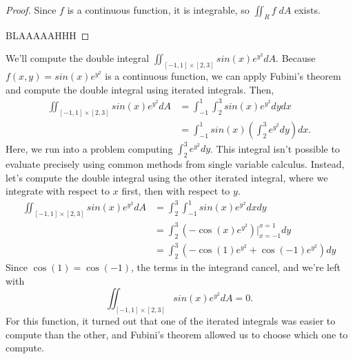 \documentclass{ximera}
\begin{document}
\begin{proof}
Since $f$ is a continuous function, it is integrable, so $\iint_R f\;dA$ exists.

BLAAAAAHHH
\end{proof}

\begin{example}
We'll compute the double integral $\iint_{[-1,1]\times [2,3]} sin(x)e^{y^2}dA$. Because $f(x,y) = sin(x)e^{y^2}$ is a continuous function, we can apply Fubini's theorem and compute the double integral using iterated integrals. Then,
\begin{align*}
\iint_{[-1,1]\times [2,3]} sin(x)e^{y^2}dA &= \int_{-1}^1\int_2^3sin(x)e^{y^2} dydx\\
&= \int_{-1}^1sin(x)\left(\int_2^3e^{y^2} dy\right)dx.
\end{align*}
Here, we run into a problem computing $\int_2^3e^{y^2} dy$. This integral isn't possible to evaluate precisely using common methods from single variable calculus. Instead, let's compute the double integral using the other iterated integral, where we integrate with respect to $x$ first, then with respect to $y$.
\begin{align*}
\iint_{[-1,1]\times [2,3]} sin(x)e^{y^2}dA &= \int_2^3\int_{-1}^1 sin(x)e^{y^2} dxdy\\
&= \int_2^3\left(-\cos(x)e^{y^2}\right)|_{x = -1}^{x = 1}dy\\
&= \int_2^3\left(-\cos(1)e^{y^2} + \cos(-1)e^{y^2}\right)dy
\end{align*}
Since $\cos(1) = \cos(-1)$, the terms in the integrand cancel, and we're left with 
\[
\iint_{[-1,1]\times [2,3]} sin(x)e^{y^2}dA = 0.
\]
For this function, it turned out that one of the iterated integrals was easier to compute than the other, and Fubini's theorem allowed us to choose which one to compute.
\end{example}
\end{document}
